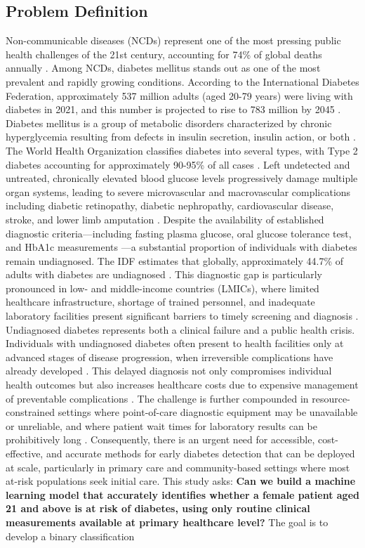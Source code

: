 \documentclass[12pt]{article}
\begin{document}
\subsection{Problem Definition}
Non-communicable diseases (NCDs) represent one of the most pressing public health 
challenges of the 21st century, accounting for 74\% of global deaths annually \citep{WHO2023NCD}. 
Among NCDs, diabetes mellitus stands out as one of the most prevalent and rapidly growing conditions. According to the International Diabetes Federation, approximately 537 million adults (aged 20-79 years) were living with diabetes in 2021, and this number is projected to rise to 783 million by 2045 \citep{IDF2021}. Diabetes mellitus is a group of metabolic disorders characterized by chronic hyperglycemia resulting from defects in insulin secretion, insulin action, or both \citep{ADA2023Standards}. The World Health Organization classifies diabetes into several types, with Type 2 diabetes accounting for approximately 90-95\% of all cases \citep{WHO2023Diabetes}. Left undetected and untreated, chronically elevated blood glucose levels progressively damage multiple organ systems, leading to severe microvascular and macrovascular complications including diabetic retinopathy, diabetic nephropathy, cardiovascular disease, stroke, and lower limb amputation \citep{Brownlee2001, Forbes2013}. Despite the availability of established diagnostic criteria—including fasting plasma glucose, oral glucose tolerance test, and HbA1c measurements \citep{ADA2023Standards}—a substantial proportion of individuals with diabetes remain undiagnosed. The IDF estimates that globally, approximately 44.7\% of adults with diabetes are undiagnosed \citep{IDF2021}. This diagnostic gap is particularly pronounced in low- and middle-income countries (LMICs), where limited healthcare infrastructure, shortage of trained personnel, and inadequate laboratory facilities present significant barriers to timely screening and diagnosis \citep{Atun2017, Manne2019}. Undiagnosed diabetes represents both a clinical failure and a public health crisis. Individuals with undiagnosed diabetes often present to health facilities only at advanced stages of disease progression, when irreversible complications have already developed \citep{Harris2000, Beagley2014}. This delayed diagnosis not only compromises individual health outcomes but also increases healthcare costs due to expensive management of preventable complications \citep{ADA2018Economics, Bommer2018}. The challenge is further compounded in resource-constrained settings where point-of-care diagnostic equipment may be unavailable or unreliable, and where patient wait times for laboratory results can be prohibitively long \citep{Kapoor2020, Rhee2021}. Consequently, there is an urgent need for accessible, cost-effective, and accurate methods for early diabetes detection that can be deployed at scale, particularly in primary care and community-based settings where most at-risk populations seek initial care. This study asks: \textbf{Can we build a machine learning model that accurately identifies whether a female patient aged 21 and above is at risk of diabetes, using only routine clinical measurements available at primary healthcare level?} The goal is to develop a binary classification 
\end{document}
